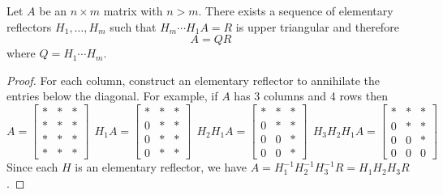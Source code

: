 \begin{theorem}
Let $A$ be an $n \times m$ matrix with $n > m$. There exists a sequence of elementary reflectors $H_1,\dots,H_m$ such that $H_m\cdots H_1A = R$ is upper triangular and therefore
$$
A = QR
$$
where $Q = H_1 \cdots H_m$.

\begin{proof}
For each column, construct an elementary reflector to annihilate the entries below the diagonal. For example, if $A$ has 3 columns and 4 rows then
$$
A = \begin{bmatrix} * & * & * \\ * & * & * \\ * & * & * \\ * & * & * \end{bmatrix}
\ \
H_1A = \begin{bmatrix} * & * & * \\ 0 & * & * \\ 0 & * & * \\ 0 & * & * \end{bmatrix}
\ \ 
H_2H_1A = \begin{bmatrix} * & * & * \\ 0 & * & * \\ 0 & 0 & * \\ 0 & 0 & * \end{bmatrix}
\ \
H_3H_2H_1A = \begin{bmatrix} * & * & * \\ 0 & * & * \\ 0 & 0 & * \\ 0 & 0 & 0 \end{bmatrix}
$$
Since each $H$ is an elementary reflector, we have $A=H_1^{-1}H_2^{-1}H_3^{-1}R=H_1H_2H_3R$.
\end{proof}
\end{theorem}


